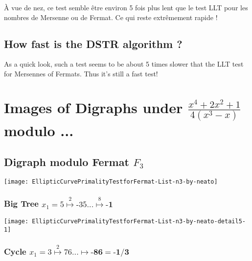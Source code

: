 \documentclass[latin1]{quadrature}
\newif\ifenfrancais
\begin{document}
\begin{article}
\begin{article}
\`A vue de nez, ce test semble \^etre environ 5 fois plus lent que le test LLT pour les nombres de Mersenne ou de Fermat. Ce qui reste extr\^emement rapide !
\else
\subsection { How fast is the DSTR algorithm ? }

As a quick look, such a test seems to be about 5 times slower that the LLT test for Mersennes of Fermats. Thus it's still a fast test!
\fi



\ifenfrancais
\section { Images de Digraphs sous  $\frac{\displaystyle x^4+2x^2+1}{\displaystyle 4(x^3-x)}$ modulo ... }
\else
\section { Images of Digraphs under $\frac{\displaystyle x^4+2x^2+1}{\displaystyle 4(x^3-x)}$ modulo ... }
\fi

\subsection { Digraph modulo Fermat $F_3$ }

\texttt{[image: EllipticCurvePrimalityTestforFermat-List-n3-by-neato]}


\ifenfrancais
\subsubsection {Arbre G\'eant  $x_1 = 5 \stackrel{2}{\mapsto} \text{-35} ... \stackrel{8}{\mapsto} \textbf{-1}$}
\else
\subsubsection {Big Tree  $x_1 = 5 \stackrel{2}{\mapsto} \text{-35} ... \stackrel{8}{\mapsto} \textbf{-1}$}
\fi

\texttt{[image: EllipticCurvePrimalityTestforFermat-List-n3-by-neato-detail5-1]}


\subsubsection {Cycle  $x_1 = 3 \stackrel{2}{\mapsto} \text{76} ... \stackrel{}{\mapsto} \textbf{-86} = \textbf{-1/3}$}


\end{article}
\end{article}
\end{document}
